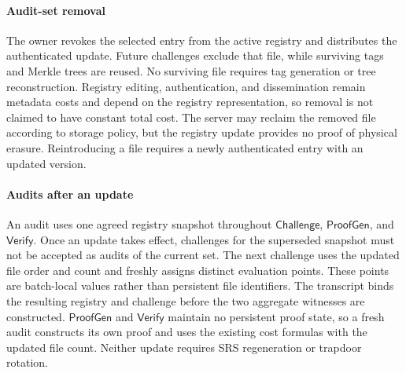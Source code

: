 \documentclass[lettersize,journal]{IEEEtran}
\newcommand{\Chal}{\ensuremath{\mathsf{Challenge}}}
\newcommand{\ProofGen}{\ensuremath{\mathsf{ProofGen}}}
\newcommand{\Verify}{\ensuremath{\mathsf{Verify}}}
\begin{document}
\paragraph{Audit-set removal}
The owner revokes the selected entry from the active registry and distributes the authenticated update. Future challenges exclude that file, while surviving tags and Merkle trees are reused. No surviving file requires tag generation or tree reconstruction. Registry editing, authentication, and dissemination remain metadata costs and depend on the registry representation, so removal is not claimed to have constant total cost. The server may reclaim the removed file according to storage policy, but the registry update provides no proof of physical erasure. Reintroducing a file requires a newly authenticated entry with an updated version.

\paragraph{Audits after an update}
An audit uses one agreed registry snapshot throughout \Chal{}, \ProofGen{}, and \Verify{}. Once an update takes effect, challenges for the superseded snapshot must not be accepted as audits of the current set. The next challenge uses the updated file order and count and freshly assigns distinct evaluation points. These points are batch-local values rather than persistent file identifiers. The transcript binds the resulting registry and challenge before the two aggregate witnesses are constructed. \ProofGen{} and \Verify{} maintain no persistent proof state, so a fresh audit constructs its own proof and uses the existing cost formulas with the updated file count. Neither update requires SRS regeneration or trapdoor rotation.
\end{document}
